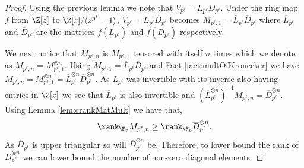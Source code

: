 \begin{proof}
Using the previous lemma we note that $V_{p^\ell}=L_{p^\ell}D_{p^\ell}$. Under the ring map $f$ from $\Z[z]$ to $\Z[z]/\langle z^{p^\ell}-1\rangle$, $V_{p^\ell}=L_{p^\ell}D_{p^\ell}$ becomes $M_{p^\ell,1}=\overline{L}_{p^\ell}\overline{D}_{p^\ell}$ where $\overline{L}_{p^\ell}$ and $\overline{D}_{p^\ell}$ are the matrices $f(L_{p^\ell})$ and $f(D_{p^\ell})$ respectively.

We next notice that $M_{p^\ell,n}$ is $M_{p^\ell,1}$ tensored with itself $n$ times which we denote as $M_{p^\ell,n}=M_{p^\ell,1}^{\otimes n}$. Using $M_{p^\ell,1}=\overline{L}_{p^\ell}\overline{D}_{p^\ell}$ and Fact \ref{fact:multOfKronecker} we have $M_{p^\ell,n}=M_{p^\ell,1}^{\otimes n}=\overline{L}_{p^\ell}^{\otimes n}\overline{D}_{p^\ell}^{\otimes n}$. As $L_{p^\ell}$ was invertible with its inverse also having entries in $\Z[z]$ we see that $\overline{L}_{p^\ell}$ is also invertible and $\left(\overline{L}_{p^\ell}^{\otimes n}\right)^{-1}M_{p^\ell,n}= \overline{D}_{p^\ell}^{\otimes n}$. Using Lemma \ref{lem:crankMatMult} we have that,
$$\rank_{\F_p} M_{p^\ell,n}\ge \rank_{\F_p} \overline{D}_{p^\ell}^{\otimes n}.$$
As $\overline{D}_{p^\ell}$ is upper triangular so will $\overline{D}_{p^\ell}^{\otimes n}$ be. Therefore, to lower bound the rank of $\overline{D}_{p^\ell}^{\otimes n}$ we can lower bound the number of non-zero diagonal elements. 


\end{proof}
